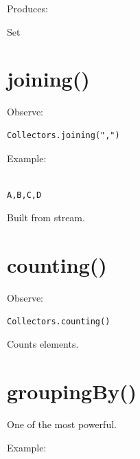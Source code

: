 \documentclass[11pt,a4paper]{book}
\begin{document}

Produces:


Set


\section{joining()}

Observe:

\begin{verbatim} 
Collectors.joining(",")
\end{verbatim}


Example:

\begin{verbatim}

A,B,C,D

\end{verbatim}


Built from stream.


\section{counting()}

Observe:

\begin{verbatim} 
Collectors.counting()
\end{verbatim}


Counts elements.


\section{groupingBy()}

One of the most powerful.


Example:
\end{document}
